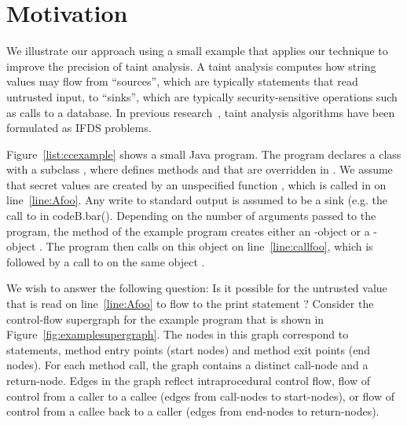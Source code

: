 \section{Motivation}
  \label{sec:MotivatingExample}
  
We illustrate our approach using a small example that
applies our technique to improve the precision of taint analysis.
A taint analysis computes how string values
may flow from ``sources'', which are typically statements that read untrusted input, 
to ``sinks'', which are typically security-sensitive
operations such as calls to 
a database. In previous research~\cite{DBLP:conf/issta/GuarnieriPTDTB11,DBLP:conf/pldi/ArztRFBBKTOM14}, 
taint analysis algorithms have been formulated as IFDS problems.     



Figure~\ref{list:ccexample} shows a small Java program.
The program
declares a class  with a subclass ,  where  defines methods 
 and  that are overridden in .  
We assume  that secret values are created by 
an unspecified function , which is called in  on 
line~\ref{line:Afoo}. 
Any write to standard output 
is assumed to be a sink (e.g. the call to  in code{B.bar()}.
Depending on the number of 
arguments passed to the program, the  method of the example program creates 
either an -object or a -object%
. The 
program then calls  on this object
on line~\ref{line:callfoo}, which is 
followed by a call to  on the same object%
.  
 
We wish to answer the following question: Is it possible for the untrusted value 
that is read on line~\ref{line:Afoo} to flow to the print statement%
?
Consider the control-flow
supergraph for the example program that is shown in Figure~\ref{fig:examplesupergraph}.
 The nodes in this graph correspond to statements, method entry points (start nodes) and 
method exit points (end nodes). For each method call, the graph contains a 
distinct call-node and a return-node. Edges in the graph reflect intraprocedural control flow, 
flow of control from a caller to a callee (edges from call-nodes to start-nodes), or
flow of control from a callee back to a caller (edges from end-nodes to return-nodes). 

